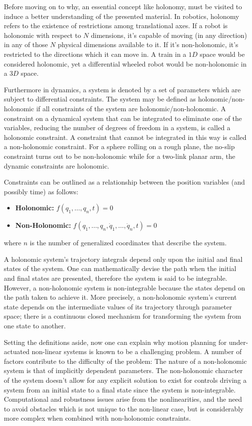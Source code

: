 \documentclass[letterpaper, 10 pt, conference]{ieeeconf}
\begin{document}
Before moving on to why, an essential concept like holonomy, must be visited to induce a better understanding of the presented material. In robotics, holonomy refers to the existence of restrictions among translational axes. If a robot is holonomic with respect to $N$ dimensions, it's capable of moving (in any direction) in any of those $N$ physical dimensions available to it. If it's non-holonomic, it's restricted to the directions which it can move in. A train in a $1D$ space would be considered holonomic, yet a differential wheeled robot would be non-holonomic in a $3D$ space.

Furthermore in dynamics, a system is denoted by a set of parameters which are subject to differential constraints. The system may be defined as holonomic/non-holonomic if all constraints of the system are holonomic/non-holonomic. A constraint on a dynamical system that can be integrated to eliminate one of the variables, reducing the number of degrees of freedom in a system, is called a holonomic constraint. A constraint that cannot be integrated in this way is called a non-holonomic constraint. For a sphere rolling on a rough plane, the no-slip constraint turns out to be non-holonomic while for a two-link planar arm, the dynamic constraints are holonomic. 

Constraints can be outlined as a relationship between the position variables (and possibly time) as follows:

\begin{itemize}
  \item \textbf{Holonomic:} $f(q_1, \ldots, q_n, t) = 0$
  \item \textbf{Non-Holonomic:} $f(q_1, \ldots, q_n, \dot q_1, \ldots,\dot q_n,t) = 0$
\end{itemize}

where $n$ is the number of generalized coordinates that describe the system.

A holonomic system’s trajectory integrals depend only upon the initial and final states of the system. One can mathematically devise the path when the initial and final states are presented, therefore the system is said to be integrable. However, a non-holonomic system is non-integrable because the states depend on the path taken to achieve it. More precisely, a non-holonomic system's current state depends on the intermediate values of its trajectory through parameter space; there is a continuous closed mechanism for transforming the system from one state to another.

Setting the definitions aside, now one can explain why motion planning for under-actuated non-linear systems is known to be a challenging problem. A number of factors contribute to the difficulty of the problem: The nature of a non-holonomic system is that of implicitly dependent parameters. The non-holonomic character of the system doesn’t allow for any explicit solution to exist for controls driving a system from an initial state to a final state since the system is non-integrable. Computational and robustness issues arise from the nonlinearities, and the need to avoid obstacles which is not unique to the non-linear case, but is considerably more complex when combined with non-holonomic constraints.
\end{document}
